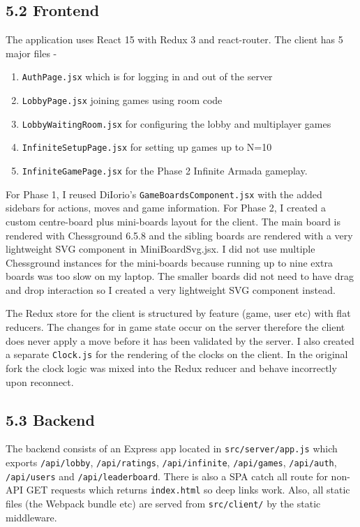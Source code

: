 \documentclass[11pt,a4paper]{article}
\begin{document}
\subsection*{5.2 Frontend}
The application uses React 15 with Redux 3 and react-router. The client has 5 major files -
\begin{enumerate}
    \item \texttt{AuthPage.jsx} which is for logging in and out of the server
    \item \texttt{LobbyPage.jsx} joining games using room code
    \item \texttt{LobbyWaitingRoom.jsx} for configuring the lobby and multiplayer games
    \item \texttt{InfiniteSetupPage.jsx} for setting up games up to N=10
    \item \texttt{InfiniteGamePage.jsx} for the Phase 2 Infinite Armada gameplay.
\end{enumerate}

For Phase 1, I reused DiIorio’s \texttt{GameBoardsComponent.jsx} with the added sidebars for actions, moves and game information. For Phase 2, I created a custom centre-board plus mini-boards layout for the client. The main board is rendered with Chessground 6.5.8 and the sibling boards are rendered with a very lightweight SVG component in MiniBoardSvg.jsx. I did not use multiple Chessground instances for the mini-boards because running up to nine extra boards was too slow on my laptop. The smaller boards did not need to have drag and drop interaction so I created a very lightweight SVG component instead.

The Redux store for the client is structured by feature (game, user etc) with flat reducers. The changes for in game state occur on the server therefore the client does never apply a move before it has been validated by the server. I also created a separate \texttt{Clock.js} for the rendering of the clocks on the client. In the original fork the clock logic was mixed into the Redux reducer and behave incorrectly upon reconnect.

\subsection*{5.3 Backend}
The backend consists of an Express app located in \texttt{src/server/app.js} which exports \texttt{/api/lobby}, \texttt{/api/ratings}, \texttt{/api/infinite}, \texttt{/api/games}, \texttt{/api/auth}, \texttt{/api/users} and \texttt{/api/leaderboard}. There is also a SPA catch all route for non-API GET requests which returns \texttt{index.html} so deep links work. Also, all static files (the Webpack bundle etc) are served from \texttt{src/client/} by the static middleware.
\end{document}
